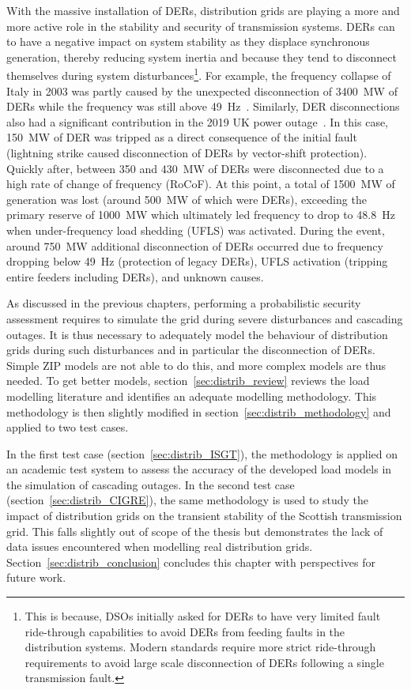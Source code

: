 With the massive installation of DERs, distribution grids are playing a more and more active role in the stability and security of transmission systems. DERs can to have a negative impact on system stability as they displace synchronous generation, thereby reducing system inertia and because they tend to disconnect themselves during system disturbances\footnote{This is because, DSOs initially asked for DERs to have very limited fault ride-through capabilities to avoid DERs from feeding faults in the distribution systems. Modern standards require more strict ride-through requirements to avoid large scale disconnection of DERs following a single transmission fault.}. For example, the frequency collapse of Italy in 2003 was partly caused by the unexpected disconnection of 3400~MW of DERs while the frequency was still above 49~Hz~\cite[p115]{Italy2003}. Similarly, DER disconnections also had a significant contribution in the 2019 UK power outage~\cite{2019UKBlackout}. In this case, 150~MW of DER was tripped as a direct consequence of the initial fault (lightning strike caused disconnection of DERs by vector-shift protection). Quickly after, between 350 and 430~MW of DERs were disconnected due to a high rate of change of frequency (RoCoF). At this point, a total of 1500~MW of generation was lost (around 500~MW of which were DERs), exceeding the primary reserve of 1000~MW which ultimately led frequency to drop to 48.8~Hz when under-frequency load shedding (UFLS) was activated. During the event, around 750~MW additional disconnection of DERs occurred due to frequency dropping below 49~Hz (protection of legacy DERs), UFLS activation (tripping entire feeders including DERs), and unknown causes. %

As discussed in the previous chapters, performing a probabilistic security assessment requires to simulate the grid during severe disturbances and cascading outages. It is thus necessary to adequately model the behaviour of distribution grids during such disturbances and in particular the disconnection of DERs. Simple ZIP models are not able to do this, and more complex models are thus needed. To get better models, section~\ref{sec:distrib_review} reviews the load modelling literature and identifies an adequate modelling methodology. This methodology is then slightly modified in section~\ref{sec:distrib_methodology} and applied to two test cases.

In the first test case (section~\ref{sec:distrib_ISGT}), the methodology is applied on an academic test system to assess the accuracy of the developed load models in the simulation of cascading outages. In the second test case (section~\ref{sec:distrib_CIGRE}), the same methodology is used to study the impact of distribution grids on the transient stability of the Scottish transmission grid. This falls slightly out of scope of the thesis but demonstrates the lack of data issues encountered when modelling real distribution grids. Section~\ref{sec:distrib_conclusion} concludes this chapter with perspectives for future work.


